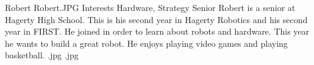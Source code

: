 {Robert}
{Robert.JPG}
{Interests}
{Hardware, Strategy}
{Senior}
{
Robert is a senior at Hagerty High School. This is his second year in Hagerty Robotics and his second year in FIRST. He joined in order to learn about robots and hardware. This year he wants to build a great robot. He enjoys playing video games and playing basketball.
}
{.jpg}
{.jpg}